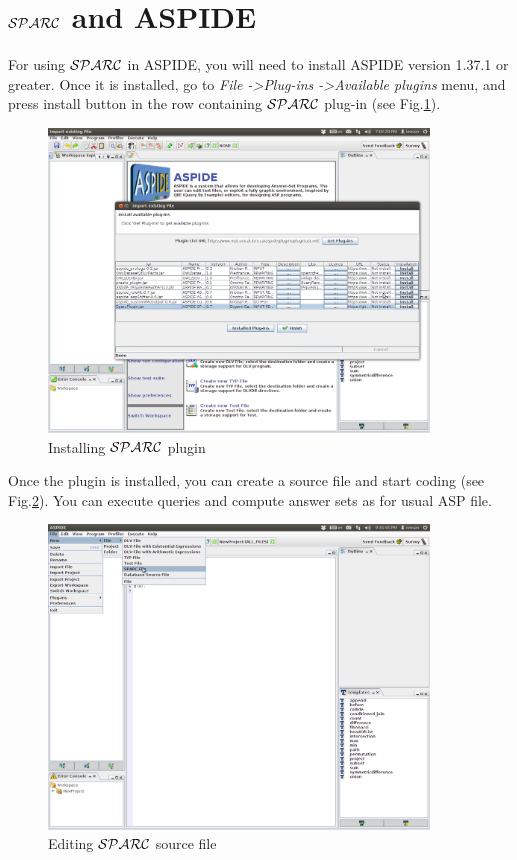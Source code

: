 \documentclass[12pt, letterpaper]{article}
\begin{document}
\section{${\cal SPARC}$ and ASPIDE}
For using ${\cal SPARC}$ in ASPIDE, you will need to install ASPIDE version 1.37.1 or greater. Once it is installed, go to \textit{File -\textgreater Plug-ins -\textgreater Available plugins} menu, 
and press install button in the row containing ${\cal SPARC}$ plug-in (see Fig.\ref{fig:plug_install}).
\begin{figure}[p]
\centering
\includegraphics[width=0.9\textwidth]{plugin.png}
\caption{Installing ${\cal SPARC}$ plugin}
\label{fig:plug_install}
\end{figure}

Once the plugin is installed, you can create a source file and start coding (see Fig.\ref{fig:sparc_file}).
You can execute queries and compute answer sets as for usual ASP file.
\begin{figure}[p]
\centering
\includegraphics[width=0.9\textwidth]{sparc_file.png}
\caption{Editing  ${\cal SPARC}$ source file}
\label{fig:sparc_file}
\end{figure}


\end{document}
